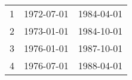 % 
\begin{tabular}{ccc}
  \hline
  \hline
1 & 1972-07-01 & 1984-04-01 \\ 
  2 & 1973-01-01 & 1984-10-01 \\ 
  3 & 1976-01-01 & 1987-10-01 \\ 
  4 & 1976-07-01 & 1988-04-01 \\ 
   \hline
\end{tabular}
